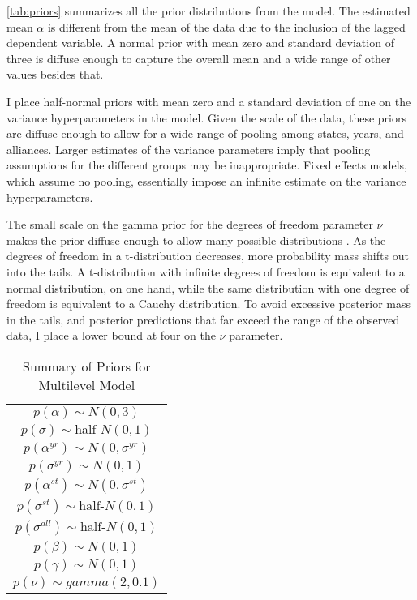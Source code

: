 \documentclass[12pt]{article}
\begin{document}
\autoref{tab:priors} summarizes all the prior distributions from the model. The estimated mean $\alpha$ is different from the mean of the data due to the inclusion of the lagged dependent variable. A normal prior with mean zero and standard deviation of three is diffuse enough to capture the overall mean and a wide range of other values besides that. 

I place half-normal priors with mean zero and a standard deviation of one on the variance hyperparameters in the model. Given the scale of the data, these priors are diffuse enough to allow for a wide range of pooling among states, years, and alliances. Larger estimates of the variance parameters imply that pooling assumptions for the different groups may be inappropriate. Fixed effects models, which assume no pooling, essentially impose an infinite estimate on the variance hyperparameters. 

The small scale on the gamma prior for the degrees of freedom parameter $\nu$ makes the prior diffuse enough to allow many possible distributions \citep{JuarezSteele2010}. As the degrees of freedom in a t-distribution decreases, more probability mass shifts out into the tails. A t-distribution with infinite degrees of freedom is equivalent to a normal distribution, on one hand, while the same distribution with one degree of freedom is equivalent to a Cauchy distribution. To avoid excessive posterior mass in the tails, and posterior predictions that far exceed the range of the observed data, I place a lower bound at four on the $\nu$ parameter. 


\begin{table} %

 \begin{center}
\begin{tabular}{c} 
$ p(\alpha) \sim N(0, 3)$  \\
$ p(\sigma) \sim \mbox{half-}N(0, 1) $ \\
$ p(\alpha^{yr}) \sim N(0, \sigma^{yr}) $ \\ 
$ p(\sigma^{yr}) \sim N(0, 1) $ \\
$ p(\alpha^{st}) \sim N(0, \sigma^{st}) $ \\ 
$ p(\sigma^{st}) \sim \mbox{half-}N(0, 1) $ \\ 
$ p(\sigma^{all}) \sim \mbox{half-}N(0, 1) $ \\
$ p(\beta) \sim N(0, 1) $ \\
$ p(\gamma) \sim N(0, 1) $ \\ 
$ p(\nu) \sim gamma(2, 0.1)$ 
\end{tabular} 
\end{center} 

\caption{Summary of Priors for Multilevel Model}
\label{tab:priors}
\end{table} 
\end{document}
